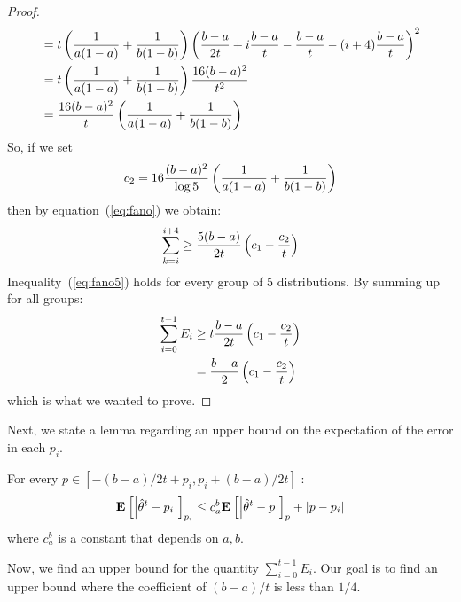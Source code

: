 \begin{proof}
\begin{align*}
&= t\left(\frac{1}{a(1-a)} + \frac{1}{b(1-b)}\right)\left(\frac{b-a}{2t} + i\frac{b-a}{t} - \frac{b-a}{t} -(i+4)\frac{b-a}{t}\right)^2\\
&= t\left(\frac{1}{a(1-a)} + \frac{1}{b(1-b)}\right) \frac{16(b-a)^2}{t^2}\\
&= \frac{16(b-a)^2}{t} \left(\frac{1}{a(1-a)} + \frac{1}{b(1-b)}\right) 
\end{align*}
So, if we set $$c_2 = 16\frac{(b-a)^2}{\log5}\left(\frac{1}{a(1-a)} + \frac{1}{b(1-b)}\right)$$ 
then by equation~(\ref{eq:fano}) we obtain:
\begin{equation}\label{eq:fano5}
\sum_{k =i}^{i+4} \geq \frac{5(b-a)}{2t}\left(c_1 - \frac{c_2}{t}\right)
\end{equation}
Inequality~(\ref{eq:fano5}) holds for every group of 5 distributions. By summing up for all groups:
\begin{align*}
\sum_{i=0}^{t-1} E_i &\geq t \frac{b-a}{2t}\left(c_1 - \frac{c_2}{t}\right)\\
&= \frac{b-a}{2}\left(c_1 - \frac{c_2}{t}\right)
\end{align*}
which is what we wanted to prove. 


\end{proof}
Next, we state a lemma regarding an upper bound on the expectation of the error in each $p_i$.
\begin{lemma}\label{l:cauchy_schwarz}
For every $p\in [-(b-a)/{2t} + p_i , p_i + (b-a)/{2t}]$ :
$$\Exp{\lp|\hat{\theta}^t-p_i\rp|}_{p_i} \leq c_a^b\Exp{\lp|\hat{\theta}^t-p\rp|}_p + \lp|p - p_i\rp|
$$
where $c_a^b$ is a constant that depends on $a,b$.
 
\end{lemma}
Now, we find an upper bound for the quantity $\sum_{i=0}^{t-1} E_i$.
Our goal is to find an upper bound where the coefficient of $(b-a)/t$ is less than $1/4$.

